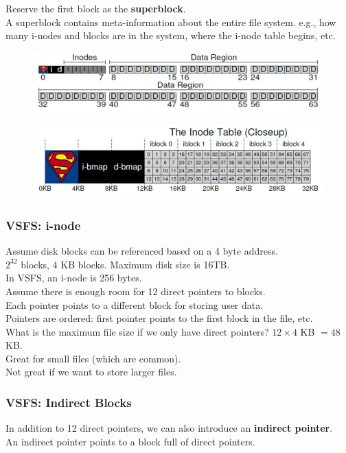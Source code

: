 \documentclass[12pt]{article}
\theoremstyle{plain}
\theoremstyle{definition}
\begin{document}
Reserve the first block as the \textbf{superblock}. \\
A superblock contains meta-information about the entire file system.
e.g., how many i-nodes and blocks are in the system, where the i-node table begins, etc.
\begin{figure}[H]
  \centering
  \includegraphics[scale=0.8]{pictures/vsfs_4.png}
\end{figure}
\begin{figure}[H]
  \vspace{-20pt}
  \centering
  \includegraphics[scale=0.8]{pictures/vsfs_5.png}
\end{figure}

\subsubsection{VSFS: i-node}
Assume disk blocks can be referenced based on a 4 byte address. \\
$2^{32}$ blocks, 4 KB blocks.
Maximum disk size is 16TB. \\

In VSFS, an i-node is 256 bytes. \\
Assume there is enough room for 12 direct pointers to blocks. \\
Each pointer points to a different block for storing user data. \\
Pointers are ordered: first pointer points to the first block in the file, etc. \\

What is the maximum file size if we only have direct pointers? $12 \times 4$ KB $= 48$ KB. \\
Great for small files (which are common). \\
Not great if we want to store larger files.

\subsubsection{VSFS: Indirect Blocks}
In addition to 12 direct pointers, we can also introduce an \textbf{indirect pointer}. \\
An indirect pointer points to a block full of direct pointers. \\
\end{document}
